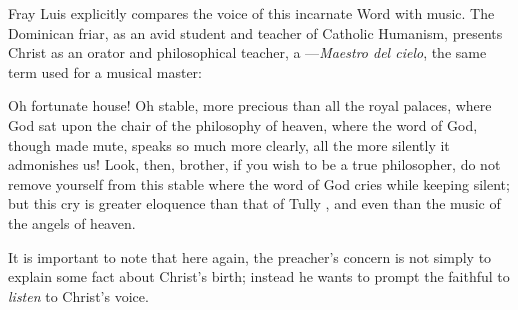 Fray Luis explicitly compares the voice of this incarnate Word with music.
The Dominican friar, as an avid student and teacher of Catholic Humanism,
presents Christ as an orator and philosophical teacher, a ---\emph{Maestro del cielo}, the same term used for a musical master:
\begin{quoting}
    Oh fortunate house!
    Oh stable, more precious than all the royal palaces, where God sat upon the
    chair  of the philosophy of heaven, where the word of God,
    though made mute, speaks so much more clearly, all the more silently it
    admonishes us!
    Look, then, brother, if you wish to be a true philosopher, do not remove
    yourself from this stable where the word of God cries while keeping silent;
    but this cry is greater eloquence than that of Tully , and even
    than the music of the angels of heaven.%
        \Autocite
        [39: .]
        {LuisdeGranada:Xmas}
\end{quoting}
It is important to note that here again, the preacher's concern is not simply to
explain some fact about Christ's birth; instead he wants to prompt the faithful
to \emph{listen} to Christ's voice.

